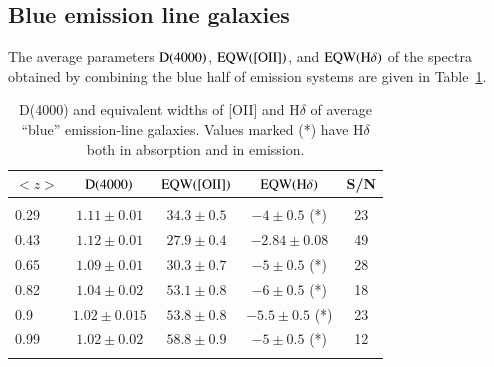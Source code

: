 \documentclass[referee]{aa}
\begin{document}
\subsection{Blue emission line galaxies}
\label{reservoir}

The average parameters $\rm D(4000)$, $\rm EQW([OII])$,
and  $\rm EQW(H\delta)$ of the spectra obtained by combining the blue half of emission systems
 are given in Table~\ref{blueEQW}.


\begin{table}
\renewcommand{\arraystretch}{0.9}
\centering 
\caption{D(4000) and equivalent widths of  [OII] and  H$\delta$  of  average ``blue'' emission-line galaxies. Values marked (*) have  H$\delta$ both in absorption and in emission.\rm}
\begin{tabular}{ l c c c c} 
  $<z>$   & $\rm D(4000)$     & $\rm EQW([OII])$ &  $\rm EQW(H\delta)$ &  S/N  \\ \hline
& & & & \\
 0.29     & $ 1.11 \pm 0.01$  &  $34.3 \pm 0.5$  &   $-4 \pm 0.5$  (*) &  23   \\
0.43  & $ 1.12 \pm 0.01$  & $27.9 \pm 0.4$   & $-2.84 \pm 0.08$    &  49 \\
0.65  & $ 1.09 \pm 0.01$  & $30.3 \pm 0.7$   & $-5 \pm 0.5$  (*)   &  28 \\
 0.82     & $ 1.04 \pm 0.02$  & $53.1 \pm 0.8$ & $-6 \pm 0.5$ (*)      &  18 \\
0.9   & $ 1.02 \pm 0.015$ & $53.8 \pm 0.8$ & $-5.5 \pm 0.5$  (*)   &  23 \\ 
0.99      & $ 1.02 \pm 0.02$  & $58.8 \pm 0.9$ & $-5 \pm 0.5$   (*)    &  12 \\
\hline \hline
\label{blueEQW}
\end{tabular}
\end{table}



\end{document}
